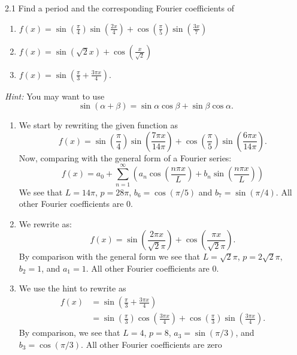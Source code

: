
\begin{problem}{2.1}
   Find a period and the corresponding Fourier coefficients of
   \begin{enumerate}[label=\alph*)]
    \item $f(x) = \sin \left( \frac{\pi}{4} \right) \sin \left( \frac{2x}{4} \right) + \cos \left( \frac{\pi}{5} \right) \sin \left( \frac{3x}{7} \right)$
    \item $f(x) = \sin \left( \sqrt{2}x \right) + \cos \left( \frac{x}{\sqrt{2}} \right)$
    \item $f(x) = \sin \left( \frac{\pi}{3} + \frac{3 \pi x}{4} \right)$.
   \end{enumerate}
   \textit{Hint:} You may want to use
   \begin{equation*}
     \sin \left( \alpha + \beta \right) = \sin \alpha \cos \beta  + \sin \beta \cos \alpha
   .\end{equation*}
\end{problem}

\begin{derivation}
  \begin{enumerate}[label=\alph*)]
    \item We start by rewriting the given function as
      \begin{equation*}
        f(x) = \sin \left( \frac{\pi}{4} \right) \sin \left( \frac{7 \pi x}{14 \pi} \right) + \cos \left( \frac{\pi}{5} \right) \sin \left( \frac{6 \pi x}{14 \pi} \right)
      .\end{equation*}
      Now, comparing with the general form of a Fourier series:
     \begin{equation*}
      f(x) = a_0 + \sum_{n = 1}^{\infty} \left( a_n \cos \left( \frac{n \pi x}{L} \right) + b_n \sin \left( \frac{n \pi x}{L} \right) \right)
     \end{equation*}
     We see that $L = 14\pi$, $p = 28\pi$, $b_6 = \cos (\pi / 5)$ and $b_7 = \sin (\pi / 4)$.
     All other Fourier coefficients are 0.
    \item We rewrite as:
      \begin{equation*}
        f(x) = \sin \left(\frac{2\pi x}{\sqrt{2} \pi} \right) + \cos \left( \frac{\pi x}{\sqrt{2}\pi} \right)
      .\end{equation*}
      By comparison with the general form we see that $L = \sqrt{2}\pi$, $p = 2 \sqrt{2}\pi$, $b_2 = 1$, and $a_1 = 1$.
      All other Fourier coefficients are 0.
    \item We use the hint to rewrite as
      \begin{align*}
        f(x) &= \sin \left( \frac{\pi}{3} + \frac{3\pi x}{4} \right) \\
             &= \sin \left( \frac{\pi}{3} \right) \cos \left( \frac{3 \pi x}{4} \right) + \cos \left( \frac{\pi}{3} \right) \sin \left( \frac{3 \pi x}{4} \right)
      .\end{align*}
      By comparison, we see that $L = 4$, $p = 8$, $a_3 = \sin (\pi / 3)$, and $b_3 = \cos (\pi / 3)$.
      All other Fourier coefficients are zero
  \end{enumerate}
\end{derivation}

